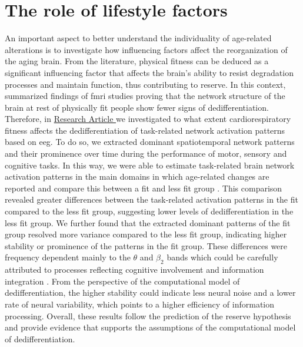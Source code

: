 \section{The role of lifestyle factors}
An important aspect to better understand the individuality of age-related alterations is to investigate how influencing factors affect the reorganization of the aging brain. From the literature, physical fitness can be deduced as a significant influencing factor that affects the brain's ability to resist degradation processes and maintain function, thus contributing to reserve. In this context, \citeauthor{Stillman2019} \cite{Stillman2019} summarized findings of \gls{fmri} studies proving that the network structure of the brain at rest of physically fit people show fewer signs of dedifferentiation. Therefore, in \hyperref[results:paperIII]{Research Article } we investigated to what extent cardiorespiratory fitness affects the dedifferentiation of task-related network activation patterns based on \gls{eeg}. To do so, we extracted dominant spatiotemporal network patterns and their prominence over time during the performance of motor, sensory and cognitive tasks. In this way, we were able to estimate task-related brain network activation patterns in the main domains in which age-related changes are reported and compare this between a fit and less fit group \cite{Baltes1997, Sala-Llonch2015, Park2009}. This comparison revealed greater differences between the task-related activation patterns in the fit compared to the less fit group, suggesting lower levels of dedifferentiation in the less fit group. We further found that the extracted dominant patterns of the fit group resolved more variance compared to the less fit group, indicating higher stability or prominence of the patterns in the fit group. These differences were frequency dependent mainly to the $\theta$ and $\beta_2$ bands which could be carefully attributed to processes reflecting cognitive involvement and information integration \cite{Siegel2012}. From the perspective of the computational model of dedifferentiation, the higher stability could indicate less neural noise and a lower rate of neural variability, which points to a higher efficiency of information processing. Overall, these results follow the prediction of the reserve hypothesis and provide evidence that supports the assumptions of the computational model of dedifferentiation.\\

